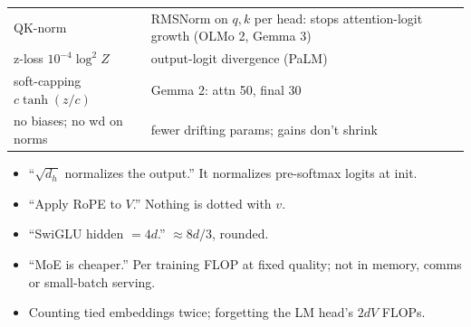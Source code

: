 \begin{mem}
\begin{tabularx}{\linewidth}{@{}lL@{}}
\toprule
QK-norm & RMSNorm on $q,k$ per head: stops attention-logit growth (OLMo 2, Gemma 3)\\
z-loss $10^{-4}\log^2Z$ & output-logit divergence (PaLM)\\
soft-capping $c\tanh(z/c)$ & Gemma 2: attn 50, final 30\\
no biases; no wd on norms & fewer drifting params; gains don't shrink\\\bottomrule
\end{tabularx}
\end{mem}

\begin{qa}
\end{qa}

\begin{trap}
\begin{itemize}
\item ``$\sqrt{d_h}$ normalizes the output.'' It normalizes pre-softmax logits at init.
\item ``Apply RoPE to $V$.'' Nothing is dotted with $v$.
\item ``SwiGLU hidden $=4d$.'' $\approx8d/3$, rounded.
\item ``MoE is cheaper.'' Per training FLOP at fixed quality; not in memory, comms or small-batch serving.
\item Counting tied embeddings twice; forgetting the LM head's $2dV$ FLOPs.
\end{itemize}
\end{trap}
